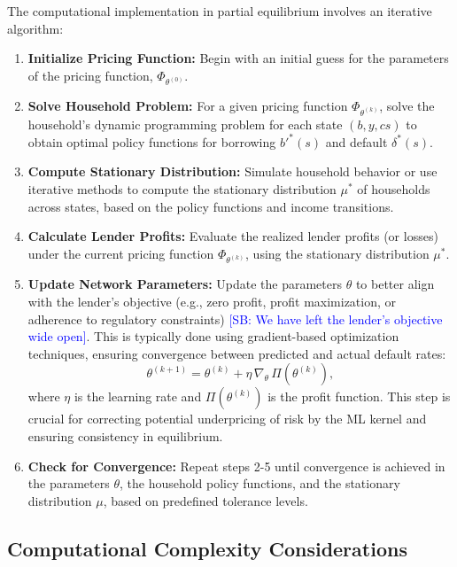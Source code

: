 \documentclass[acmsmall]{acmart}
\newcommand{\spb}[1]{\textcolor{blue}{[SB: #1]}}
\begin{document}
The computational implementation in partial equilibrium involves an iterative algorithm:
\begin{enumerate}
    \item \textbf{Initialize Pricing Function:} Begin with an initial guess for the parameters of the pricing function, $\Phi_{\theta^{(0)}}$.
    \item \textbf{Solve Household Problem:} For a given pricing function $\Phi_{\theta^{(k)}}$, solve the household's dynamic programming problem for each state $(b,y,cs)$ to obtain optimal policy functions for borrowing $b'^{*}(s)$ and default $\delta^{*}(s)$.
    \item \textbf{Compute Stationary Distribution:} Simulate household behavior or use iterative methods to compute the stationary distribution $\mu^{*}$ of households across states, based on the policy functions and income transitions.
    \item \textbf{Calculate Lender Profits:} Evaluate the realized lender profits (or losses) under the current pricing function $\Phi_{\theta^{(k)}}$, using the stationary distribution $\mu^{*}$.
    \item \textbf{Update Network Parameters:} Update the parameters $\theta$ to better align with the lender's objective (e.g., zero profit, profit maximization, or adherence to regulatory constraints)  \spb{We have left the lender's objective wide open}. This is typically done using gradient-based optimization techniques, ensuring convergence between predicted and actual default rates:
    \begin{equation}
        \theta^{(k+1)} = \theta^{(k)} + \eta \, \nabla_{\theta} \, \Pi(\theta^{(k)}),
    \end{equation}
    where $\eta$ is the learning rate and $\Pi(\theta^{(k)})$ is the profit function. This step is crucial for correcting potential underpricing of risk by the ML kernel and ensuring consistency in equilibrium.
    \item \textbf{Check for Convergence:} Repeat steps 2-5 until convergence is achieved in the parameters $\theta$, the household policy functions, and the stationary distribution $\mu$, based on predefined tolerance levels.
\end{enumerate}

\subsection{Computational Complexity Considerations}
\end{document}
